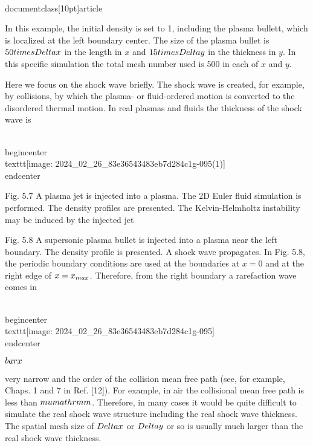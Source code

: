 \\documentclass[10pt]{article}
\begin{document}
{In this example, the initial density is set to 1, including the plasma bullett, which is localized at the left boundary center. The size of the plasma bullet is $50 \\times \\Delta x$ in the length in $x$ and $15 \\times \\Delta y$ in the thickness in $y$. In this specific simulation the total mesh number used is 500 in each of $x$ and $y$.

Here we focus on the shock wave briefly. The shock wave is created, for example, by collisions, by which the plasma- or fluid-ordered motion is converted to the disordered thermal motion. In real plasmas and fluids the thickness of the shock wave is

\\begin{center}
\\texttt{[image: 2024\_02\_26\_83e36543483eb7d284c1g-095(1)]}
\\end{center}

Fig. 5.7 A plasma jet is injected into a plasma. The 2D Euler fluid simulation is performed. The density profiles are presented. The Kelvin-Helmholtz instability may be induced by the injected jet

Fig. 5.8 A supersonic plasma bullet is injected into a plasma near the left boundary. The density profile is presented. A shock wave propagates. In Fig. 5.8, the periodic boundary conditions are used at the boundaries at $x=0$ and at the right edge of $x=x_{\\max }$. Therefore, from the right boundary a rarefaction wave comes in

\\begin{center}
\\texttt{[image: 2024\_02\_26\_83e36543483eb7d284c1g-095]}
\\end{center}

$\\bar{x}$

very narrow and the order of the collision mean free path (see, for example, Chaps. 1 and 7 in Ref. [12]). For example, in air the collisional mean free path is less than $\\mu \\mathrm{m}$. Therefore, in many cases it would be quite difficult to simulate the real shock wave structure including the real shock wave thickness. The spatial mesh size of $\\Delta x$ or $\\Delta y$ or so is usually much larger than the real shock wave thickness.

}
\end{document}
